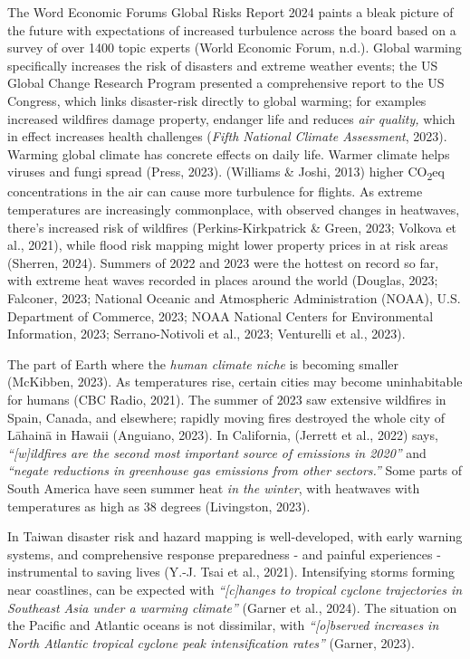\documentclass[
  12pt,
  letterpaper,
  DIV=11,
  numbers=noendperiod]{scrartcl}
\begin{document}
The Word Economic Forums Global Risks Report 2024 paints a bleak picture
of the future with expectations of increased turbulence across the board
based on a survey of over 1400 topic experts (World Economic Forum,
n.d.). Global warming specifically increases the risk of disasters and
extreme weather events; the US Global Change Research Program presented
a comprehensive report to the US Congress, which links disaster-risk
directly to global warming; for examples increased wildfires damage
property, endanger life and reduces \emph{air quality,} which in effect
increases health challenges (\emph{Fifth {National Climate Assessment}},
2023). Warming global climate has concrete effects on daily life. Warmer
climate helps viruses and fungi spread (Press, 2023). (Williams \&
Joshi, 2013) higher CO\textsubscript{2}eq concentrations in the air can
cause more turbulence for flights. As extreme temperatures are
increasingly commonplace, with observed changes in heatwaves, there's
increased risk of wildfires (Perkins-Kirkpatrick \& Green, 2023; Volkova
et al., 2021), while flood risk mapping might lower property prices in
at risk areas (Sherren, 2024). Summers of 2022 and 2023 were the hottest
on record so far, with extreme heat waves recorded in places around the
world (Douglas, 2023; Falconer, 2023; National Oceanic and Atmospheric
Administration (NOAA), U.S. Department of Commerce, 2023; NOAA National
Centers for Environmental Information, 2023; Serrano-Notivoli et al.,
2023; Venturelli et al., 2023).

The part of Earth where the \emph{human climate niche} is becoming
smaller (McKibben, 2023). As temperatures rise, certain cities may
become uninhabitable for humans (CBC Radio, 2021). The summer of 2023
saw extensive wildfires in Spain, Canada, and elsewhere; rapidly moving
fires destroyed the whole city of Lāhainā in Hawaii (Anguiano, 2023). In
California, (Jerrett et al., 2022) says, \emph{``{[}w{]}ildfires are the
second most important source of emissions in 2020''} and \emph{``negate
reductions in greenhouse gas emissions from other sectors.''} Some parts
of South America have seen summer heat \emph{in the winter}, with
heatwaves with temperatures as high as 38 degrees (Livingston, 2023).

In Taiwan disaster risk and hazard mapping is well-developed, with early
warning systems, and comprehensive response preparedness - and painful
experiences - instrumental to saving lives (Y.-J. Tsai et al., 2021).
Intensifying storms forming near coastlines, can be expected with
\emph{``{[}c{]}hanges to tropical cyclone trajectories in Southeast Asia
under a warming climate''} (Garner et al., 2024). The situation on the
Pacific and Atlantic oceans is not dissimilar, with
\emph{``{[}o{]}bserved increases in North Atlantic tropical cyclone peak
intensification rates''} (Garner, 2023).
\end{document}
